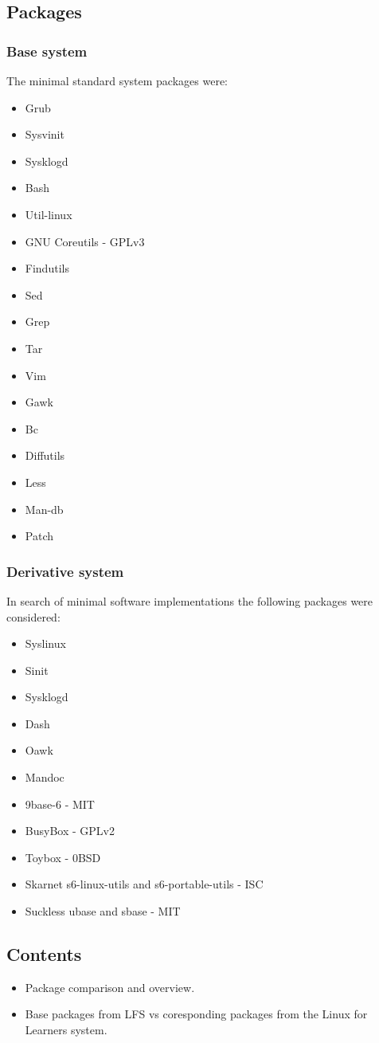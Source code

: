 \subsection{Packages}\label{Packages}

\subsubsection{Base system}

The minimal standard system packages were:

\begin{itemize}
    \item Grub
    \item Sysvinit
    \item Sysklogd
    \item Bash
    \item Util-linux
    \item GNU Coreutils \cite{coreutils} - GPLv3
    \item Findutils
    \item Sed
    \item Grep
    \item Tar
    \item Vim
    \item Gawk
    \item Bc
    \item Diffutils
    \item Less
    \item Man-db
    \item Patch
\end{itemize}

\subsubsection{Derivative system}

In search of minimal software implementations the following packages were considered:

\begin{itemize}
    \item Syslinux
    \item Sinit
    \item Sysklogd
    \item Dash
    \item Oawk
    \item Mandoc
    \item 9base-6 \cite{9base} - MIT
    \item BusyBox \cite{busybox} - GPLv2
    \item Toybox \cite{toybox} - 0BSD
    \item Skarnet s6-linux-utils \cite{s6-linux} and s6-portable-utils \cite{s6-portable} - ISC
    \item Suckless ubase \cite{ubase} and sbase \cite{sbase} - MIT
\end{itemize}

\subsection{Contents}

\begin{itemize}
    \item Package comparison and overview.
    \item Base packages from LFS vs coresponding packages from the Linux for Learners system.
\end{itemize}

